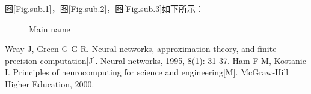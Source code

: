 \documentclass[a4paper, 12pt, centering]{article}
\begin{document}
图\ref{Fig.sub.1}，图\ref{Fig.sub.2}，图\ref{Fig.sub.3}如下所示：
\begin{figure}[H]
    \centering  %
    \caption{Main name}
    \label{Fig.main}
\end{figure}


\begin{thebibliography}{1}
     Wray J, Green G G R. Neural networks, approximation theory, and finite precision computation[J]. Neural networks, 1995, 8(1): 31-37.
     Ham F M, Kostanic I. Principles of neurocomputing for science and engineering[M]. McGraw-Hill Higher Education, 2000.
\end{thebibliography}
\end{document}
